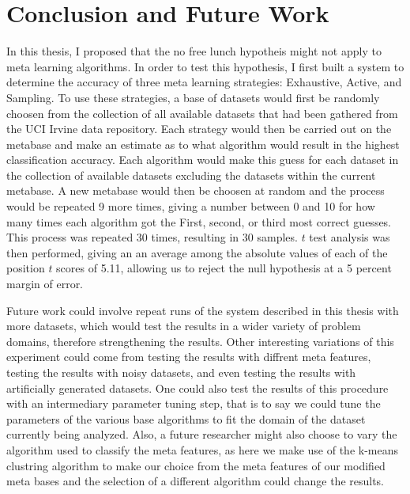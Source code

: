 \chapter{Conclusion and Future Work}
\label{Chapter5}
In this thesis, I proposed that the no free lunch hypotheis might not apply to
meta learning algorithms. In order to test this hypothesis, I first built a
system to determine the accuracy of three meta learning strategies:
Exhaustive, Active, and Sampling. To use these strategies, a base of
datasets would first be randomly choosen from the collection of all available
datasets that had been gathered from the UCI Irvine data repository.
Each strategy would then be carried out on the metabase and make an
estimate as to what algorithm would result in the highest classification
accuracy. Each algorithm would make this guess for each dataset in the
collection of available datasets excluding the datasets within the current
metabase. A new metabase would then be choosen at random and the process would be
repeated 9 more times, giving a number between 0 and 10 for how many times
each algorithm got the First, second, or third most correct guesses.
This process was repeated 30 times, resulting in 30 samples. $t$ test analysis
was then performed, giving an an average among the absolute values of each of
the position $t$ scores of 5.11, allowing us to reject the null
hypothesis at a 5 percent margin of error.

Future work could involve repeat runs of the system described in this thesis
with more datasets, which would test the results in a wider variety of problem
domains, therefore strengthening the results. Other interesting variations of
this experiment could come from testing the results with diffrent meta features,
testing the results with noisy datasets, and even testing the results with
artificially generated datasets. One could also test the results of this
procedure with an intermediary parameter tuning step, that is to say
we could tune the parameters of the various base algorithms to fit the domain
of the dataset currently being analyzed. Also, a future researcher might also
choose to vary the algorithm used to classify the meta features, as here we
make use of the k-means clustring algorithm to make our choice from the meta
features of our modified meta bases and the selection of a different algorithm
could change the results.
